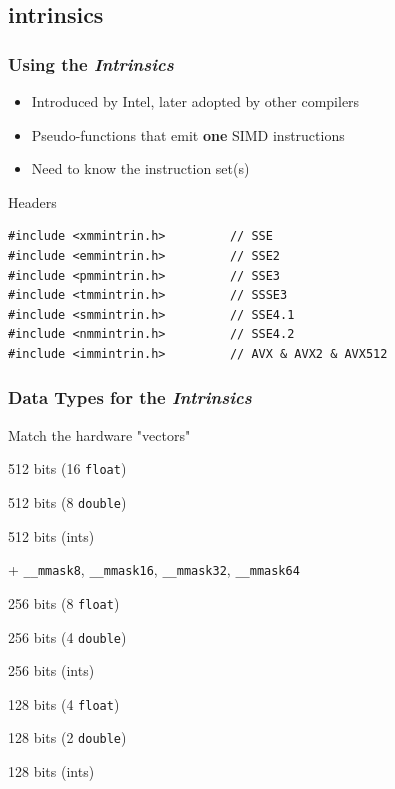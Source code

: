 \documentclass[xcolor={x11names,svgnames}]{beamer}
\begin{document}
\subsection{intrinsics}

\begin{frame}[fragile=singleslide]
  \frametitle{Using the \emph{Intrinsics}}

  \begin{itemize}
  \item Introduced by Intel, later adopted by other compilers
  \item Pseudo-functions that emit \textbf{one} SIMD instructions
  \item Need to know the instruction set(s)
  \end{itemize}
  
  
\begin{block}{Headers}
  \begin{verbatim}
#include <xmmintrin.h>         // SSE
#include <emmintrin.h>         // SSE2
#include <pmmintrin.h>         // SSE3
#include <tmmintrin.h>         // SSSE3
#include <smmintrin.h>         // SSE4.1
#include <nmmintrin.h>         // SSE4.2
#include <immintrin.h>         // AVX & AVX2 & AVX512
\end{verbatim}
\end{block}

\end{frame}


\begin{frame}[fragile=singleslide]
  \frametitle{Data Types for the \emph{Intrinsics}}

\begin{block}{Match the hardware "vectors"}
  
  \begin{description}
  \item[\texttt{\_\_m512}] 512 bits (16 \texttt{float})
  \item[\texttt{\_\_m512d}] 512 bits (8 \texttt{double})
  \item[\texttt{\_\_m512i}] 512 bits (ints)
  \item + \texttt{\_\_mmask8}, \texttt{\_\_mmask16}, \texttt{\_\_mmask32}, \texttt{\_\_mmask64}
    
  \item[\texttt{\_\_m256}] 256 bits (8 \texttt{float})
  \item[\texttt{\_\_m256d}] 256 bits (4 \texttt{double})
  \item[\texttt{\_\_m256i}] 256 bits (ints)
    
  \item[\texttt{\_\_m128}] 128 bits (4 \texttt{float})
  \item[\texttt{\_\_m128d}] 128 bits (2 \texttt{double})
  \item[\texttt{\_\_m128i}] 128 bits (ints)
  \end{description}
\end{block}
\end{frame}
\end{document}
